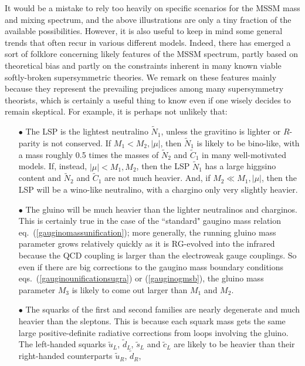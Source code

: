 \documentclass[11pt]{article}
\def\stilde{\widetilde}
\begin{document}
It would be a mistake to rely too heavily on specific scenarios for the 
MSSM mass and mixing spectrum, and the above illustrations are only
a tiny fraction of the available possibilities. However, it is also 
useful to keep in mind some general trends that often recur in various 
different models. Indeed, there has emerged a sort of folklore 
concerning likely features of the MSSM spectrum, partly based on 
theoretical bias and partly on the constraints inherent in many known viable 
softly-broken supersymmetric theories. We remark on these features mainly 
because they represent the prevailing prejudices among many supersymmetry 
theorists, which is certainly a useful thing to know even if one wisely 
decides to remain skeptical. For example, it is perhaps not unlikely that:
%
\begin{itemize}
%
\item[$\bullet$] The LSP is the lightest neutralino $\stilde N_1$, unless 
the gravitino is lighter or $R$-parity is not conserved. If $M_1 <  
M_2,|\mu|$, then $\stilde N_1$ is likely to be bino-like, with a mass 
roughly 
0.5 times the masses of $\stilde N_2$ and $\stilde C_1$ in many
well-motivated models. If, instead, 
$|\mu| < M_1,M_2$, then the LSP $\stilde N_1$ 
has a large higgsino content and 
$\stilde N_2$ and $\stilde C_1$ are not much heavier.
And, if $M_2 \ll M_1, |\mu|$, then the LSP will be a wino-like
neutralino, with a chargino only very slightly heavier.
%
\item[$\bullet$] The gluino will be much heavier than the lighter 
neutralinos and charginos. This is certainly true in the case of the 
``standard" gaugino mass relation eq.~(\ref{gauginomassunification}); more 
generally, the running gluino mass parameter grows relatively quickly as 
it is RG-evolved into the infrared because the QCD coupling is larger than 
the electroweak gauge couplings. So even if there are big corrections to 
the gaugino mass boundary conditions eqs.~(\ref{gauginounificationsugra}) 
or (\ref{gauginogmsb}), the gluino mass parameter $M_3$ is likely to come 
out larger than $M_1$ and $M_2$.
%
\item[$\bullet$] The squarks of the first and second families are nearly 
degenerate and much heavier than the sleptons. This is because each squark 
mass gets the same large positive-definite radiative corrections from 
loops involving the gluino. The left-handed squarks $\stilde u_L$, 
$\stilde d_L$, $\stilde s_L$ and $\stilde c_L$ are likely to be heavier 
than their right-handed counterparts $\stilde u_R$, $\stilde d_R$, 

\end{itemize}
\end{document}
